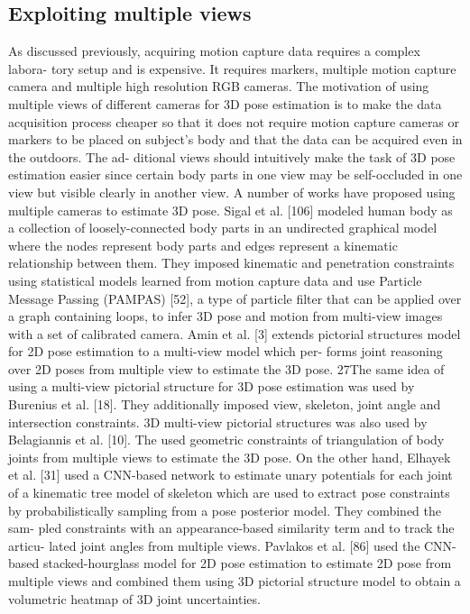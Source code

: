 \subsection{Exploiting multiple views}

As discussed previously, acquiring motion capture data requires a complex labora-
tory setup and is expensive. It requires markers, multiple motion capture camera
and multiple high resolution RGB cameras. The motivation of using multiple views
of different cameras for 3D pose estimation is to make the data acquisition process
cheaper so that it does not require motion capture cameras or markers to be placed
on subject’s body and that the data can be acquired even in the outdoors. The ad-
ditional views should intuitively make the task of 3D pose estimation easier since
certain body parts in one view may be self-occluded in one view but visible clearly
in another view.
A number of works have proposed using multiple cameras to estimate 3D pose.
Sigal et al. [106] modeled human body as a collection of loosely-connected body
parts in an undirected graphical model where the nodes represent body parts and
edges represent a kinematic relationship between them. They imposed kinematic
and penetration constraints using statistical models learned from motion capture
data and use Particle Message Passing (PAMPAS) [52], a type of particle filter
that can be applied over a graph containing loops, to infer 3D pose and motion
from multi-view images with a set of calibrated camera. Amin et al. [3] extends
pictorial structures model for 2D pose estimation to a multi-view model which per-
forms joint reasoning over 2D poses from multiple view to estimate the 3D pose.
27The same idea of using a multi-view pictorial structure for 3D pose estimation was
used by Burenius et al. [18]. They additionally imposed view, skeleton, joint angle
and intersection constraints. 3D multi-view pictorial structures was also used by
Belagiannis et al. [10]. The used geometric constraints of triangulation of body
joints from multiple views to estimate the 3D pose. On the other hand, Elhayek et
al. [31] used a CNN-based network to estimate unary potentials for each joint of
a kinematic tree model of skeleton which are used to extract pose constraints by
probabilistically sampling from a pose posterior model. They combined the sam-
pled constraints with an appearance-based similarity term and to track the articu-
lated joint angles from multiple views. Pavlakos et al. [86] used the CNN-based
stacked-hourglass model for 2D pose estimation to estimate 2D pose from multiple
views and combined them using 3D pictorial structure model to obtain a volumetric
heatmap of 3D joint uncertainties.

